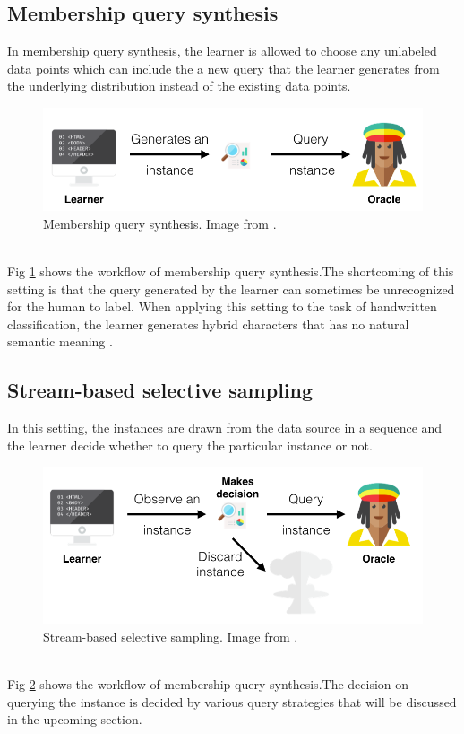 \subsection{Membership query synthesis}
In membership query synthesis, the learner is allowed to choose any unlabeled data points which can include the a new query that the learner generates from the underlying distribution instead of the existing data points. \\
\begin{figure}[h!]
	\centering
	\includegraphics[scale=0.4]{images/membership}
	\caption{Membership query synthesis. Image from \cite{active_learning_datacamp}.}
	\label{membership}
\end{figure}\\
Fig \ref{membership} shows the workflow of membership query synthesis.The shortcoming of this setting is that the query generated by the learner can sometimes be unrecognized for the human to label. When applying this setting to the task of handwritten classification, the learner generates hybrid characters that has no natural semantic meaning \cite{Settles2010}\cite{active_learning_datacamp}.

\subsection{Stream-based selective sampling}
In this setting, the instances are drawn from the data source in a sequence and the learner decide whether to query the particular instance or not. \\
\begin{figure}[h!]
	\centering
	\includegraphics[scale=0.4]{images/stream_based}
	\caption{Stream-based selective sampling. Image from \cite{active_learning_datacamp}.}
	\label{stream_based}
\end{figure}\\
Fig \ref{stream_based} shows the workflow of membership query synthesis.The decision on querying the instance is decided by various query strategies that will be discussed in the upcoming section. \cite{Settles2010}\cite{active_learning_datacamp}
